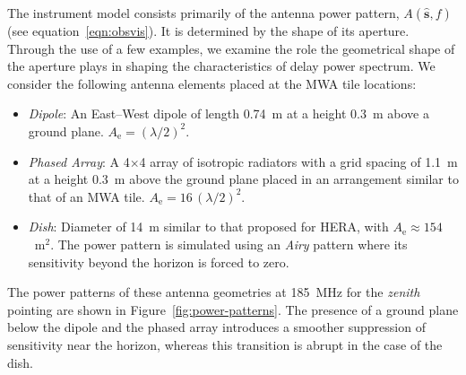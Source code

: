 \documentclass[preprint2,iop,numberedappendix]{emulateapj}
\begin{document}
The instrument model consists primarily of the antenna power pattern, $A(\hat{\boldsymbol{s}},f)$ (see equation~\ref{eqn:obsvis}). It is determined by the shape of its aperture. Through the use of a few examples, we examine the role the geometrical shape of the aperture plays in shaping the characteristics of delay power spectrum. We consider the following antenna elements placed at the MWA tile locations:
\begin{itemize}
\item {\it Dipole}: An East--West dipole of length 0.74~m at a height 0.3~m above a ground plane. $A_\textrm{e}=(\lambda/2)^2$.
\item {\it Phased Array}: A 4$\times$4 array of isotropic radiators with a grid spacing of 1.1~m at a height 0.3~m above the ground plane placed in an arrangement similar to that of an MWA tile. $A_\textrm{e}=16\,(\lambda/2)^2$. 
\item {\it Dish}: Diameter of 14~m similar to that proposed for HERA, with $A_\textrm{e}\approx 154$~m$^2$. The power pattern is simulated using an {\it Airy} pattern where its sensitivity beyond the horizon is forced to zero.
\end{itemize}

The power patterns of these antenna geometries at 185~MHz for the {\it zenith} pointing are shown in Figure~\ref{fig:power-patterns}. The presence of a ground plane below the dipole and the phased array introduces a smoother suppression of sensitivity near the horizon, whereas this transition is abrupt in the case of the dish.
\end{document}
